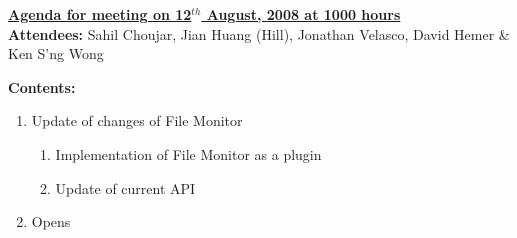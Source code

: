 \documentclass{letter}
\begin{document}
{\large \textbf{\underline{Agenda for meeting on 12$^{th}$ August, 2008 at 1000 hours}}}\\

\textbf{Attendees:} Sahil Choujar, Jian Huang (Hill), Jonathan Velasco, David Hemer \& Ken S'ng Wong

\textbf{Contents:}

\begin{enumerate}
	\item Update of changes of File Monitor
	\begin{enumerate}
	 \item Implementation of File Monitor as a plugin
	 \item Update of current API
 	\end{enumerate}
	\item Opens
\end{enumerate}
\end{document}
